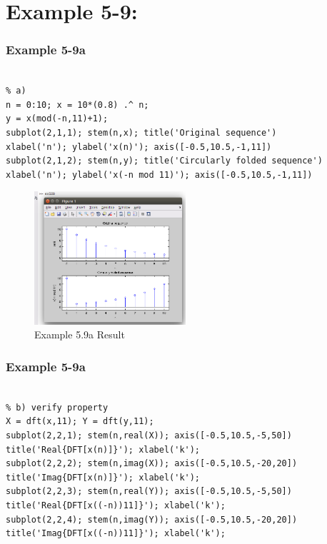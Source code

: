 \documentclass[11pt
  , a4paper
  , article
  , oneside
]{memoir}
\begin{document}
\chapter{Example 5-9:}
\subsection{Example 5-9a}
\begin{lstlisting}[style=termstyle]
% Example 5-9a

% a)
n = 0:10; x = 10*(0.8) .^ n;
y = x(mod(-n,11)+1);
subplot(2,1,1); stem(n,x); title('Original sequence')
xlabel('n'); ylabel('x(n)'); axis([-0.5,10.5,-1,11])
subplot(2,1,2); stem(n,y); title('Circularly folded sequence')
xlabel('n'); ylabel('x(-n mod 11)'); axis([-0.5,10.5,-1,11])
\end{lstlisting}

\begin{figure}[h!]
	\centering
	\includegraphics[width=0.5\textwidth,height=0.4\textwidth]{./images/ex509a.png}
	\caption{Example 5.9a Result}
	\label{fig:Example 5.9a Result}
\end{figure}

\subsection{Example 5-9a}
\begin{lstlisting}[style=termstyle]
% Example 5-9b

% b) verify property
X = dft(x,11); Y = dft(y,11);
subplot(2,2,1); stem(n,real(X)); axis([-0.5,10.5,-5,50])
title('Real{DFT[x(n)]}'); xlabel('k');
subplot(2,2,2); stem(n,imag(X)); axis([-0.5,10.5,-20,20])
title('Imag{DFT[x(n)]}'); xlabel('k');
subplot(2,2,3); stem(n,real(Y)); axis([-0.5,10.5,-5,50])
title('Real{DFT[x((-n))11]}'); xlabel('k');
subplot(2,2,4); stem(n,imag(Y)); axis([-0.5,10.5,-20,20])
title('Imag{DFT[x((-n))11]}'); xlabel('k');
\end{lstlisting}
\end{document}
